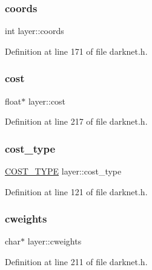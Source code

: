 \subsubsection{\texorpdfstring{coords}{coords}}
{\footnotesize\ttfamily int layer\+::coords}



Definition at line 171 of file darknet.\+h.

\mbox{\label{structlayer_a9a71dbf0ad70f63a10787d8217633776}} 
\subsubsection{\texorpdfstring{cost}{cost}}
{\footnotesize\ttfamily float$\ast$ layer\+::cost}



Definition at line 217 of file darknet.\+h.

\mbox{\label{structlayer_a8f172c29b1ada15656f1f346e7491507}} 
\subsubsection{\texorpdfstring{cost\_type}{cost\_type}}
{\footnotesize\ttfamily \mbox{\hyperlink{darknet_8h_a590358b1971d8e902008d6731f40e35c}{C\+O\+S\+T\+\_\+\+T\+Y\+PE}} layer\+::cost\+\_\+type}



Definition at line 121 of file darknet.\+h.

\mbox{\label{structlayer_a5a1da440e0ebe63674288f9006bd8ad7}} 
\subsubsection{\texorpdfstring{cweights}{cweights}}
{\footnotesize\ttfamily char$\ast$ layer\+::cweights}



Definition at line 211 of file darknet.\+h.

\mbox{\label{structlayer_ac4bc1b441b4be3b7a33d48934d883a92}} 
